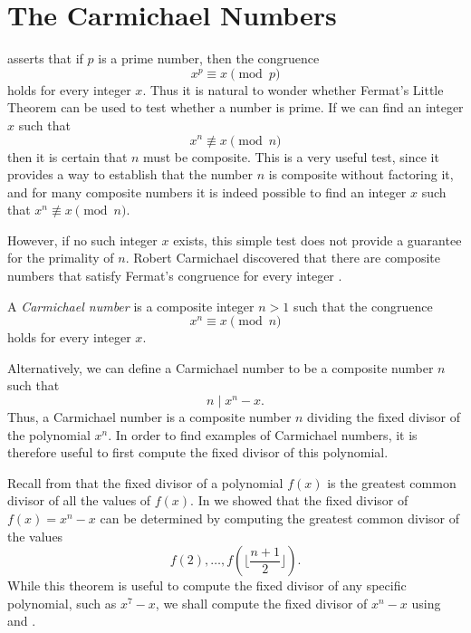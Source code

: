 \section{The Carmichael Numbers}

 asserts that if $p$ is a prime number, then the congruence
\begin{equation*}
  x^p\equiv x\pmod{p}
\end{equation*}
holds for every integer $x$. Thus it is natural to wonder whether Fermat's Little Theorem can be used to test whether a number is prime. If we can find an integer $x$ such that
\begin{equation*}
  x^n\nequiv x\pmod{n}
\end{equation*}
then it is certain that $n$ must be composite. This is a very useful test, since it provides a way to establish that the number $n$ is composite without factoring it, and for many composite numbers it is indeed possible to find an integer $x$ such that $x^n\nequiv x\pmod{n}$.

However, if no such integer $x$ exists, this simple test does not provide a guarantee for the primality of $n$. Robert Carmichael discovered that there are composite numbers that satisfy Fermat's congruence for every integer \cite{carmichael1912}.

\begin{definition}
  A \emph{Carmichael number} is a composite integer $n>1$ such that the congruence
  \begin{equation*}
    x^{n}\equiv x\pmod{n}
  \end{equation*}
  holds for every integer $x$.
\end{definition}

Alternatively, we can define a Carmichael number to be a composite number $n$ such that
\begin{equation*}
  n\mid x^n-x.
\end{equation*}
Thus, a Carmichael number is a composite number $n$ dividing the fixed divisor of the polynomial $x^n$. In order to find examples of Carmichael numbers, it is therefore useful to first compute the fixed divisor of this polynomial.

Recall from  that the fixed divisor of a polynomial $f(x)$ is the greatest common divisor of all the values of $f(x)$. In  we showed that the fixed divisor of $f(x)=x^n-x$ can be determined by computing the greatest common divisor of the values
\begin{equation*}
  f(2),\ldots,f(\lfloor{\textstyle\frac{n+1}{2}}\rfloor).
\end{equation*}
While this theorem is useful to compute the fixed divisor of any specific polynomial, such as $x^7-x$, we shall compute the fixed divisor of $x^n-x$ using  and .


